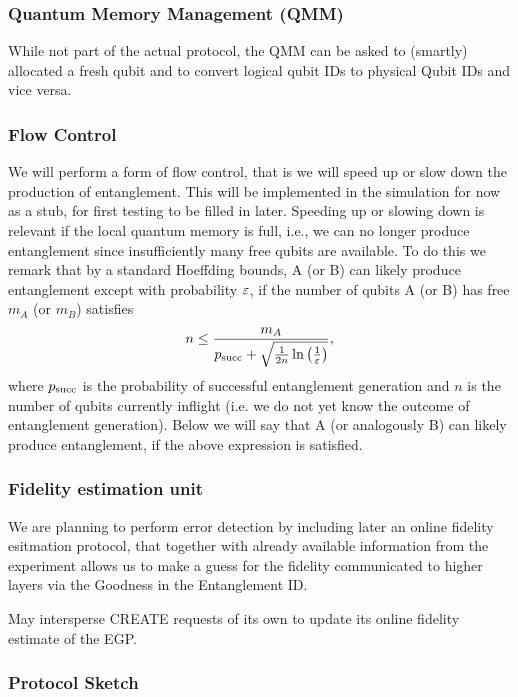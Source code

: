 \documentclass{article}
\begin{document}
\subsubsection{Quantum Memory Management (QMM)}
While not part of the actual protocol, the QMM can be asked to (smartly) allocated a fresh qubit and to convert logical qubit IDs to physical Qubit IDs and vice versa.

\subsubsection{Flow Control}
We will perform a form of flow control, that is we will speed up or slow down the production of entanglement. This will be implemented in the simulation for now as a stub, for first testing to be filled in later. Speeding up or slowing down is relevant if the local quantum memory is full, i.e., we can no longer produce entanglement since insufficiently many free qubits are available.  To do this we remark that by a standard Hoeffding bounds, A (or B) can likely produce entanglement except with probability $\varepsilon$, if the number of qubits A (or B) has free $m_A$ (or $m_B$) satisfies
\begin{align}
n \leq \frac{m_A}{p_{\rm succ} + \sqrt{\frac{1}{2n} \ln\left(\frac{1}{\varepsilon}\right)}}, 
\end{align}
where $p_{\rm succ}$ is the probability of successful entanglement generation and $n$ is the number of qubits currently inflight (i.e. we do not yet
know the outcome of entanglement generation). 
Below we will say that A (or analogously B) can likely produce entanglement, if the above expression is satisfied.

\subsubsection{Fidelity estimation unit}
We are planning to perform error detection by including later an online fidelity esitmation protocol, that together with already available information from the experiment allows us to make a guess for the fidelity communicated to higher layers via the Goodness in the Entanglement ID.

May intersperse CREATE requests of its own to update its online fidelity estimate of the EGP.


\subsubsection{Protocol Sketch}
\end{document}
